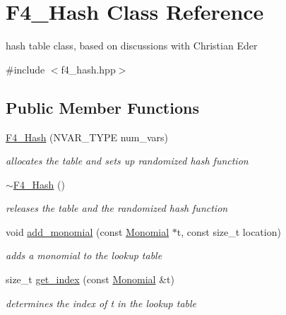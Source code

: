 \hypertarget{class_f4___hash}{}\section{F4\+\_\+\+Hash Class Reference}
\label{class_f4___hash}


hash table class, based on discussions with Christian Eder  




{\ttfamily \#include $<$f4\+\_\+hash.\+hpp$>$}

\subsection*{Public Member Functions}
\begin{DoxyCompactItemize}
\item 
\hyperlink{class_f4___hash_a3983b59e08fa7ad90bba989850f9850f}{F4\+\_\+\+Hash} (N\+V\+A\+R\+\_\+\+T\+Y\+PE num\+\_\+vars)
\begin{DoxyCompactList}\small\item\em allocates the table and sets up randomized hash function \end{DoxyCompactList}\item 
\mbox{\label{class_f4___hash_a25d18c80d34ca2b2113d0a49c92748a7}} 
\hyperlink{class_f4___hash_a25d18c80d34ca2b2113d0a49c92748a7}{$\sim$\+F4\+\_\+\+Hash} ()
\begin{DoxyCompactList}\small\item\em releases the table and the randomized hash function \end{DoxyCompactList}\item 
void \hyperlink{class_f4___hash_a86a18244162325e3d792ea39525b23f8}{add\+\_\+monomial} (const \hyperlink{group__polygroup_class_monomial}{Monomial} $\ast$t, const size\+\_\+t location)
\begin{DoxyCompactList}\small\item\em adds a monomial to the lookup table \end{DoxyCompactList}\item 
size\+\_\+t \hyperlink{class_f4___hash_a7b22f6999f276e58087fe668a01f240a}{get\+\_\+index} (const \hyperlink{group__polygroup_class_monomial}{Monomial} \&t)
\begin{DoxyCompactList}\small\item\em determines the index of {\ttfamily t} in the lookup table \end{DoxyCompactList}\item 

\end{DoxyCompactItemize}

